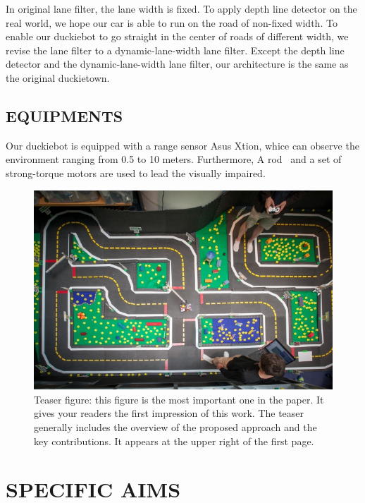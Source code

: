 \documentclass[letterpaper, 10 pt, conference]{ieeeconf}  %
\begin{document}
In original lane filter, the lane width is fixed. To apply depth line detector on the real world, we hope our car is able to run on the road of non-fixed width. To enable our duckiebot to go straight in the center of roads of different width, we revise the lane filter to a dynamic-lane-width lane filter. Except the depth line detector and the dynamic-lane-width lane filter, our architecture is the same as the original duckietown.


\subsection{EQUIPMENTS} 

Our duckiebot is equipped with a range sensor Asus Xtion, whice can observe the environment ranging from 0.5 to 10 meters. Furthermore, A rod~\cite{wei2014guide} and a set of strong-torque motors are used to lead the visually impaired.

\begin{figure}[t] %
\includegraphics[width=0.8\columnwidth]{duck}
\centering
\caption{Teaser figure: this figure is the most important one in the paper. It gives your readers the first impression of this work. The teaser generally includes the overview of the proposed approach and the key contributions. It appears at the upper right of the first page.}
\end{figure}

\section{SPECIFIC AIMS}
\end{document}
